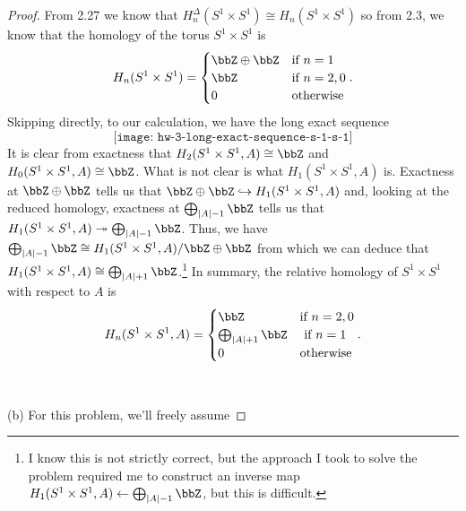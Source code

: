 \begin{proof}
From 2.27 we know that $H_n^\Delta(S^1\times S^1)\cong H_n(S^1\times S^1)$
so from 2.3, we know that the homology of the torus $S^1\times S^1$ is
\begin{equation}
\label{eq:homology-of-s-1-s-1}
H_n(S^1\times S^1)=
\begin{cases}
\bbZ\oplus\bbZ&\text{if $n=1$}\\
\bbZ&\text{if $n=2,0$}\\
0&\text{otherwise}
\end{cases}.
\end{equation}
Skipping directly, to our calculation, we have the long exact sequence
\begin{equation}
  \label{eq:long-exact-sequence-s-1-s-1}
\texttt{[image: hw-3-long-exact-sequence-s-1-s-1]}
\end{equation}
It is clear from exactness that $H_2(S^1\times S^1,A)\cong\bbZ$ and
$H_0(S^1\times S^1,A)\cong\bbZ$. What is not clear is what $H_1(S^1\times
S^1,A)$ is. Exactness at $\bbZ\oplus\bbZ$ tells us that
$\bbZ\oplus\bbZ\hookrightarrow H_1(S^1\times S^1,A)$ and, looking at the
reduced homology, exactness at $\bigoplus_{|A|-1}\bbZ$ tells us that
$H_1(S^1\times S^1,A)\twoheadrightarrow\bigoplus_{|A|-1}\bbZ$. Thus,
we have $\bigoplus_{|A|-1}\bbZ\cong H_1(S^1\times S^1,A)/\bbZ\oplus\bbZ$
from which we can deduce that $H_1(S^1\times
S^1,A)\cong\bigoplus_{|A|+1}\bbZ$.\footnote{I know this is not strictly
  correct, but the approach I took to solve the problem required me to
  construct an inverse map $H_1(S^1\times
  S^1,A)\leftarrow\bigoplus_{|A|-1}\bbZ$, but this is difficult.} In summary, the relative homology of
$S^1\times S^1$ with respect to $A$ is
\begin{equation}
  \label{eq:homology-of-s-1-s-1-a}
H_n(S^1\times S^1,A)=
\begin{cases}
\bbZ&\text{if $n=2,0$}\\
\bigoplus_{|A|+1}\bbZ&\text{ if $n=1$}\\
0&\text{otherwise}
\end{cases}.
\end{equation}
\\\\
(b) For this problem, we'll freely assume
\end{proof}
\newpage

